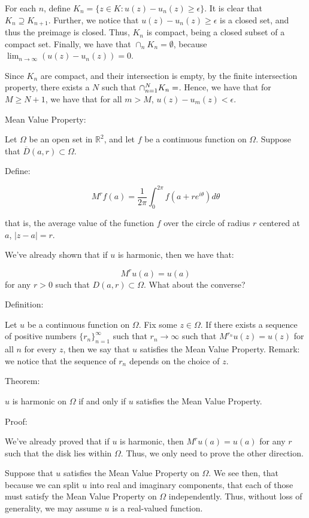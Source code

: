 \documentclass[10pt]{article}
\begin{document}
For each $n$, define $K_n = \{ z \in K : u(z) - u_n(z) \geq \epsilon \}$. It is clear that $K_n \supseteq K_{n+1}$. Further, we notice that $u(z) - u_n(z) \geq \epsilon$ is a closed set, and thus the preimage is closed. Thus, $K_n$ is compact, being a closed subset of a compact set. Finally, we have that $\cap_n K_n = \emptyset$, because $\lim_{n\to\infty} (u(z) - u_n(z)) = 0$. 

Since $K_n$ are compact, and their intersection is empty, by the finite intersection property, there exists a $N$ such that $\cap_{n=1}^N K_n = \empty$. Hence, we have that for $M \geq N+1$, we have that for all $m > M$, $u(z) - u_m(z) < \epsilon$. 

Mean Value Property:

Let $\Omega$ be an open set in $\mathbb{R}^2$, and let $f$ be a continuous function on $\Omega$. Suppose that $\overline{D}(a,r) \subset \Omega$. 

Define:

$$ M^r f(a) = \frac{1}{2\pi} \int_0^{2\pi} f(a + re^{i\theta}) d\theta $$

that is, the average value of the function $f$ over the circle of radius $r$ centered at $a$, $|z-a| = r$.

We’ve already shown that if $u$ is harmonic, then we have that:

$$M^r u(a) = u(a)$$ for any $r > 0$ such that $D(a,r) \subset \Omega$. What about the converse?

Definition:

Let $u$ be a continuous function on $\Omega$. Fix some $z \in \Omega$. If there exists a sequence of positive numbers $\{ r_n \}_{n=1}^\infty$ such that $r_n \to \infty$ such that $M^{r_n} u(z) = u(z)$ for all $n$ for every $z$, then we say that $u$ satisfies the Mean Value Property. Remark: we notice that the sequence of $r_n$ depends on the choice of $z$.

Theorem:

$u$ is harmonic on $\Omega$ if and only if $u$ satisfies the Mean Value Property.

Proof:

We’ve already proved that if $u$ is harmonic, then $M^{r} u(a) = u(a)$ for any $r$ such that the disk lies within $\Omega$. Thus, we only need to prove the other direction.

Suppose that $u$ satisfies the Mean Value Property on $\Omega$. We see then, that because we can split $u$ into real and imaginary components, that each of those must satisfy the Mean Value Property on $\Omega$ independently. Thus, without loss of generality, we may assume $u$ is a real-valued function. 
\end{document}
